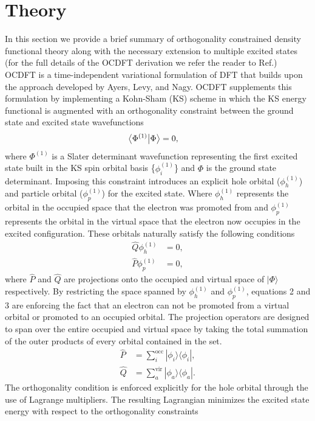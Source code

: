 \documentclass[11.5pt]{article}
\newcommand{\braket}[3][0]
{\ifthenelse{\equal{#1}{0}}{\left\langle #2 \middle| #3 \right\rangle}
{\ifthenelse{\equal{#1}{1}}{\big\langle #2 \big| #3 \big\rangle}
{\ifthenelse{\equal{#1}{2}}{\Big\langle #2 \Big| #3 \Big\rangle}
{\ifthenelse{\equal{#1}{3}}{\bigg\langle #2 \bigg| #3 \bigg\rangle}
{\ifthenelse{\equal{#1}{4}}{\Bigg\langle #2 \Bigg| #3 \Bigg\rangle}
{Error}}}}}
}
\begin{document}
\section{Theory}
In this section we provide a brief summary of orthogonality constrained density functional theory along with the necessary extension to multiple excited states (for the full details of the OCDFT derivation we refer the reader to Ref.) OCDFT is a time-independent variational formulation of DFT that builds upon the approach developed by Ayers, Levy, and Nagy.\cite{ayers_time-independent_2012} OCDFT supplements this formulation by implementing a Kohn-Sham (KS) scheme in which the KS energy functional is augmented with an orthogonality constraint between the ground state and excited state wavefunctions
\begin{align}
\braket[1]{\Phi^{(\text{1})}}{\Phi} &= 0 ,
\end{align} 
where $\Phi^{(1)}$ is a Slater determinant wavefunction representing the first excited state built in the KS spin orbital basis \{$\phi_i^{(1)}$\} and $\Phi$ is the ground state determinant. Imposing this constraint  introduces an explicit hole orbital ($\phi^{(1)}_h$) and particle orbital ($\phi^{(1)}_p$) for the excited state. Where $\phi^{(1)}_h$ represents the orbital in the occupied space that the electron was promoted from and $\phi^{(1)}_p$ represents the orbital in the virtual space that the electron now occupies in the excited configuration. These orbitals naturally satisfy the following conditions 
\begin{align}
\hat{Q}\phi_h^{(1)} &= 0 , \\
\hat{P}\phi_p^{(1)} &= 0 ,
\end{align}
where $\hat{P}$ and $\hat{Q}$ are projections onto the occupied and virtual space of $|\Phi \rangle$ respectively. By restricting the space spanned by $\phi^{(1)}_h$ and $\phi^{(1)}_p$, equations 2 and 3 are enforcing the fact that an electron can not be promoted from a virtual orbital or promoted to an occupied orbital. The projection operators are designed to span over the entire occupied and virtual space by taking the total summation of the outer products of every orbital contained in the set.
\begin{align}
\hat{P} &= \sum_i^{\text{occ}} |\phi_i\rangle \langle \phi_i| , \\
\hat{Q} &= \sum_a^{\text{vir}} |\phi_a\rangle \langle \phi_a| .
\end{align}
The orthogonality condition is enforced explicitly for the hole orbital through the use of Lagrange multipliers. The resulting Lagrangian minimizes the excited state energy with respect to the orthogonality constraints
\end{document}
